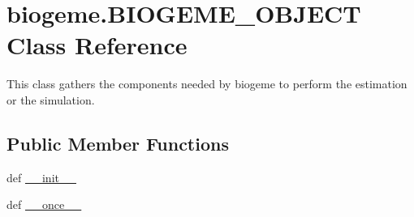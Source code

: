 \hypertarget{classbiogeme_1_1_b_i_o_g_e_m_e___o_b_j_e_c_t}{\section{biogeme.\+B\+I\+O\+G\+E\+M\+E\+\_\+\+O\+B\+J\+E\+C\+T Class Reference}
\label{classbiogeme_1_1_b_i_o_g_e_m_e___o_b_j_e_c_t}
}


This class gathers the components needed by biogeme to perform the estimation or the simulation.  


\subsection*{Public Member Functions}
\begin{DoxyCompactItemize}
\item 
def \hyperlink{classbiogeme_1_1_b_i_o_g_e_m_e___o_b_j_e_c_t_a8212f908dfb89c81d93ba1fc8d975113}{\+\_\+\+\_\+init\+\_\+\+\_\+}
\item 
def \hyperlink{classbiogeme_1_1_b_i_o_g_e_m_e___o_b_j_e_c_t_a953283b252f993ee4fc27703ba3d45bf}{\+\_\+\+\_\+once\+\_\+\+\_\+}
\end{DoxyCompactItemize}
